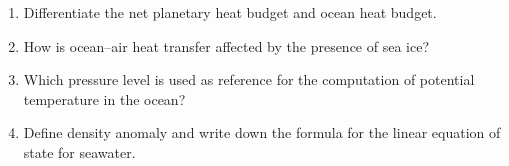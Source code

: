 \documentclass[12pt]{article}
\begin{document}
\begin{enumerate}
\item Differentiate the net planetary heat budget and ocean heat budget.

\item How is ocean–air heat transfer affected by the presence of sea ice?

\item Which pressure level is used as reference for the computation of potential temperature in the ocean?

\item Define density anomaly and write down the formula for the linear equation of state for seawater.

\end{enumerate}
\end{document}
